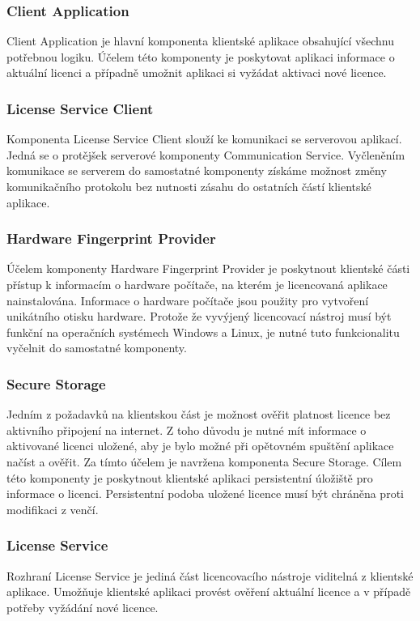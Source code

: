 \subsubsection*{Client Application}

Client Application je hlavní komponenta klientské aplikace obsahující všechnu
potřebnou logiku. Účelem této komponenty je poskytovat aplikaci informace o
aktuální licenci a případně umožnit aplikaci si vyžádat aktivaci nové licence.

\subsubsection*{License Service Client}

Komponenta License Service Client slouží ke komunikaci se serverovou aplikací.
Jedná se o protějšek serverové komponenty Communication Service. Vyčleněním
komunikace se serverem do samostatné komponenty získáme možnost změny
komunikačního protokolu bez nutnosti zásahu do ostatních částí klientské
aplikace.

\subsubsection*{Hardware Fingerprint Provider}

Účelem komponenty Hardware Fingerprint Provider je poskytnout klientské části
přístup k informacím o hardware počítače, na kterém je licencovaná aplikace
nainstalována. Informace o hardware počítače jsou použity pro vytvoření
unikátního otisku hardware. Protože že vyvýjený licencovací nástroj
musí být funkční na operačních systémech Windows a Linux, je nutné tuto
funkcionalitu vyčelnit do samostatné komponenty. 

\subsubsection*{Secure Storage}

Jedním z požadavků na klientskou část je možnost ověřit platnost licence bez
aktivního připojení na internet. Z toho důvodu je nutné mít informace o
aktivované licenci uložené, aby je bylo možné při opětovném spuštění aplikace
načíst a ověřit. Za tímto účelem je navržena komponenta Secure Storage. Cílem
této komponenty je poskytnout klientské aplikaci persistentní úložiště pro
informace o licenci. Persistentní podoba uložené licence musí být chráněna proti
modifikaci z venčí.

\subsubsection*{License Service}
 
Rozhraní License Service je jediná část licencovacího nástroje viditelná z
klientské aplikace. Umožňuje klientské aplikaci provést ověření aktuální licence
a v případě potřeby vyžádání nové licence.



